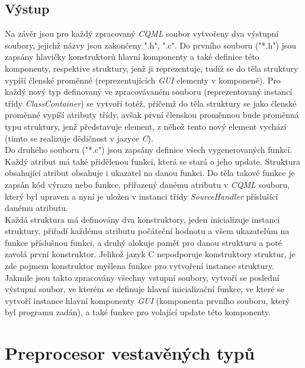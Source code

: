 \documentclass[11pt,twoside,a4paper]{book}
\begin{document}
\subsection{Výstup}
Na závěr jsou pro každý zpracovaný \textit{CQML} soubor vytvořeny dva výstupní soubory, jejichž názvy jsou zakončeny ".h", ".c". 
Do prvního souboru ("*.h") jsou zapsány hlavičky konstruktorů hlavní komponenty a také definice této komponenty, respektive struktury, jenž ji reprezentuje, tudíž se do těla struktury vypíší členské proměnné (reprezentujících \textit{GUI} elementy v komponeně). Pro každý nový typ definovaný ve zpracovávaném souboru (reprezentovaný instancí třídy \textit{ClassContainer}) se vytvoří totéž, přičemž do těla struktury se jako členské proměnné vypíší atributy třídy, avšak první členskou proměnnou bude proměnná typu struktury, jenž představuje element, z něhož tento nový element vychází (tímto se realizuje dědičnost v jazyce \textit{C}).\\
Do druhého souboru ("*.c") jsou zapsány definice všech vygenerovaných funkcí. Každý atribut má také přidělenou funkci, která se stará o jeho update. Struktura obsahující atribut obsahuje i ukazatel na danou funkci. Do těla takové funkce je zapsán kód výrazu nebo funkce, přiřazený danému atributu v \textit{CQML} souboru, který byl upraven a nyní je uložen v instanci třídy \textit{SourceHandler} příslušící danému atributu.\\
Každá struktura má definovány dva konstruktory, jeden inicializuje instanci struktury, přiřadí každému atributu počáteční hodnotu a všem ukazatelům na funkce příslušnou funkci, a druhý alokuje paměť pro danou strukturu a poté zavolá první konstruktor. Jelikož jazyk C nepodporuje konstruktory struktur, je zde pojmem konstruktor myšlena funkce pro vytvoření instance struktury.\\
Jakmile jsou takto zpracovány všechny vstupní soubory, vytvoří se poslední výstupní soubor, ve kterém se definuje hlavní inicializační funkce, ve které se vytvoří instance hlavní komponenty \textit{GUI} (komponenta prvního souboru, který byl programu zadán), a také funkce pro volající update této komponenty.\\


\section{\label{SEC:aa}Preprocesor vestavěných typů}
\end{document}
